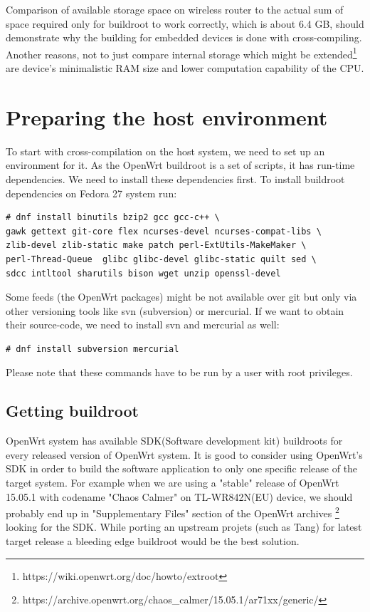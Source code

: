 Comparison of available storage space on wireless router to the actual sum of space required only for buildroot to work correctly, which is about 6.4 GB, should demonstrate why the building for embedded devices is done with cross-compiling. %
Another reasons, not to just compare internal storage which might be extended\footnote{https://wiki.openwrt.org/doc/howto/extroot} are device's minimalistic RAM size and lower computation capability of the CPU.



\section{Preparing the host environment}

To start with cross-compilation on the host system, we need to set up an environment for it.
As the OpenWrt buildroot is a set of scripts, it has run-time dependencies.
We need to install these dependencies first.
To install buildroot dependencies on Fedora 27 system run:
\begin{lstlisting}[columns=fixed,basicstyle=\ttfamily\footnotesize,tabsize=4,backgroundcolor=\color{yellow!10}]
# dnf install binutils bzip2 gcc gcc-c++ \
gawk gettext git-core flex ncurses-devel ncurses-compat-libs \
zlib-devel zlib-static make patch perl-ExtUtils-MakeMaker \
perl-Thread-Queue  glibc glibc-devel glibc-static quilt sed \
sdcc intltool sharutils bison wget unzip openssl-devel
\end{lstlisting}
Some feeds (the OpenWrt packages) might be not available over git but only via other versioning tools like svn (subversion) or mercurial.
If we want to obtain their source-code, we need to install svn and mercurial as well:
\begin{lstlisting}[columns=fixed,basicstyle=\ttfamily\footnotesize,tabsize=4,backgroundcolor=\color{yellow!10}]
# dnf install subversion mercurial
\end{lstlisting}
Please note that these commands have to be run by a user with root privileges.



\subsection{Getting buildroot}

OpenWrt system has available SDK(Software development kit) buildroots for every released version of OpenWrt system.
It is good to consider using OpenWrt's SDK in order to build the software application to only one specific release of the target system.
For example when we are using a "stable" release of OpenWrt 15.05.1 with codename "Chaos Calmer" on TL-WR842N(EU) device, we should probably end up in "Supplementary Files" section of the OpenWrt archives
\footnote{https://archive.openwrt.org/chaos\_calmer/15.05.1/ar71xx/generic/} looking for the SDK.
While porting an upstream projets (such as Tang) for latest target release a bleeding edge buildroot would be the best solution.

